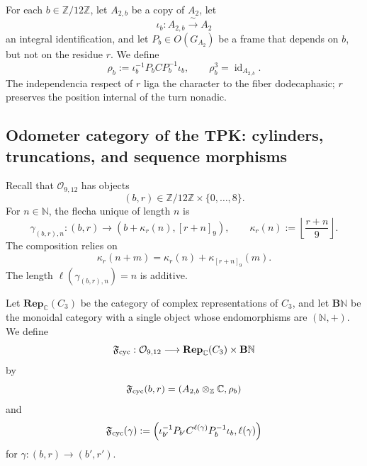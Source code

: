{For each \(b\in\mathbb Z/12\mathbb Z\), let \(A_{2,b}\) be a copy of
\(A_2\), let
\[
 \iota_b:A_{2,b}\xrightarrow{\;\sim\;}A_2
\]
an integral identification, and let
\(P_b\in O(G_{A_2})\) be a frame that depends on \(b\), but not on the residue
\(r\). We define
\begin{equation}
 \rho_b:=
 \iota_b^{-1}P_bCP_b^{-1}\iota_b,
 \qquad
 \rho_b^3=\operatorname{id}_{A_{2,b}}.
 \label{p12-83-c1-s10:eq:u006b-rho-fibra}
\end{equation}
The independencia respect of \(r\) liga the character to the fiber
dodecaphasic; \(r\) preserves the position internal of the turn nonadic.

\subsection{Odometer category of the TPK: cylinders, truncations, and sequence morphisms}

Recall that \(\mathcal O_{9,12}\) has objects
\[
 (b,r)\in\mathbb Z/12\mathbb Z\times\{0,\ldots,8\}.
\]
For \(n\in\mathbb N\), the flecha unique of length \(n\) is
\begin{equation}
 \gamma_{(b,r),n}:
 (b,r)\longrightarrow
 \left(
 b+\kappa_r(n),[r+n]_9
 \right),
 \qquad
 \kappa_r(n):=
 \left\lfloor\frac{r+n}{9}\right\rfloor.
 \label{p12-83-c1-s10:eq:u006b-flecha-odometro}
\end{equation}
The composition relies on
\begin{equation}
 \kappa_r(n+m)
 =\kappa_r(n)+\kappa_{[r+n]_9}(m).
 \label{p12-83-c1-s10:eq:u006b-cociclo-odometro}
\end{equation}
The length \(\ell(\gamma_{(b,r),n})=n\) is additive.

\begin{definition}
\label{p12-83-c1-s10:def:u006b-funtor-ciclotomico}
Let \(\mathbf{Rep}_{\mathbb C}(C_3)\) be the category of complex
representations of \(C_3\), and let \(\mathbf B\mathbb N\) be the monoidal category
with a single object whose endomorphisms are \((\mathbb N,+)\). We define
\begin{equation}
 \mathfrak F_{\rm cyc}:
 \mathcal O_{9,12}
 \longrightarrow
 \mathbf{Rep}_{\mathbb C}(C_3)\times\mathbf B\mathbb N
 \label{p12-83-c1-s10:eq:u006b-signatura-funtor}
\end{equation}
by
\[
 \mathfrak F_{\rm cyc}(b,r)
 =(A_{2,b}\otimes_{\mathbb Z}\mathbb C,\rho_b)
\]
and
\begin{equation}
 \mathfrak F_{\rm cyc}(\gamma)
 :=
 \left(
 \iota_{b'}^{-1}P_{b'}C^{\ell(\gamma)}
 P_b^{-1}\iota_b,
 \ell(\gamma)
 \right)
 \label{p12-83-c1-s10:eq:u006b-flecha-funtor}
\end{equation}
for \(\gamma:(b,r)\to(b',r')\).
\end{definition}

}
